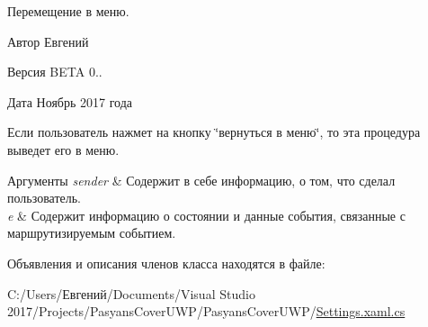 Перемещение в меню. 

\begin{DoxyAuthor}{Автор}
Евгений 
\end{DoxyAuthor}
\begin{DoxyVersion}{Версия}
B\+E\+TA 0.. 
\end{DoxyVersion}
\begin{DoxyDate}{Дата}
Ноябрь 2017 года
\end{DoxyDate}
Если пользователь нажмет на кнопку \char`\"{}вернуться в меню\char`\"{}, то эта процедура выведет его в меню. 
\begin{DoxyParams}{Аргументы}
{\em sender} & Содержит в себе информацию, о том, что сделал пользователь. \\
\hline
{\em e} & Содержит информацию о состоянии и данные события, связанные с маршрутизируемым событием. \\
\hline
\end{DoxyParams}


Объявления и описания членов класса находятся в файле\+:\begin{DoxyCompactItemize}
\item 
C\+:/\+Users/Евгений/\+Documents/\+Visual Studio 2017/\+Projects/\+Pasyans\+Cover\+U\+W\+P/\+Pasyans\+Cover\+U\+W\+P/\hyperlink{_settings_8xaml_8cs}{Settings.\+xaml.\+cs}\end{DoxyCompactItemize}

